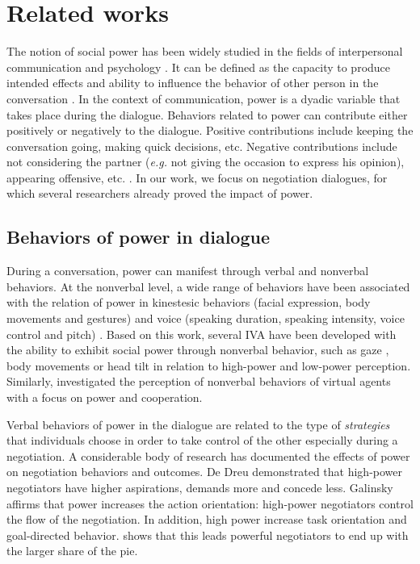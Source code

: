 \documentclass{llncs}
\begin{document}
	\section{Related works}
	The notion of social power has been widely studied in the fields of interpersonal communication and psychology \cite{kecskes2013research}. It can be defined as the capacity to produce intended effects and ability to influence the behavior of other person in the conversation \cite{dunbar2005perceptions}. In the context of communication, power is a dyadic variable that takes place during the dialogue.
	Behaviors related to power can contribute either positively or negatively to the dialogue. Positive contributions include keeping the conversation going, making quick decisions, etc. Negative contributions include not considering the partner (\emph{e.g.} not giving the occasion to express his opinion), appearing offensive, etc. \cite{zablotskaya2012relating}. In our work, we focus on negotiation dialogues, for which several researchers already proved the impact of power\cite{van2006power}.
		\vspace{-1em} 
	\subsection{Behaviors of power in dialogue}
	\label{domDialogue}
	During a conversation, power can manifest through verbal and nonverbal behaviors.	
	At the nonverbal level, a wide range of behaviors have been associated with the relation of power in kinestesic behaviors (facial expression, body movements and gestures) and voice (speaking duration, speaking intensity, voice control and pitch) \cite{burgoonnonverbal}. Based on this work, several IVA have been developed with the ability to exhibit social power through nonverbal behavior, such as gaze \cite{lance2008relation}, body movements \cite{mignault2003many} or head tilt \cite{gebhard2014exploring,callejas2014computational} in relation to high-power and low-power perception. Similarly, \cite{strassmann2016effect} investigated the perception of nonverbal behaviors of virtual agents with a focus on power and cooperation.
	
	Verbal behaviors of power in the dialogue are related to the type of \textit{strategies} that individuals choose in order to take control of the other especially during a negotiation. A considerable body of research has documented the effects of power on negotiation behaviors and outcomes. De Dreu demonstrated that \cite{de1995impact} high-power negotiators have higher aspirations, demands more and concede less. Galinsky \cite{galinsky2003power} affirms that power increases the action orientation: high-power negotiators control the flow of the negotiation. In addition, high power increase task orientation and goal-directed behavior. \cite{giebels2000interdependence} shows that this leads powerful negotiators to end up with the larger share of the pie.
	
\end{document}
